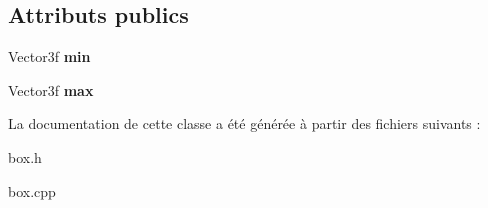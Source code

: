 \subsection*{Attributs publics}
\begin{DoxyCompactItemize}
\item 
\hypertarget{class_box_a4b5893565a3e2b26361338b19af0671a}{}Vector3f {\bfseries min}\label{class_box_a4b5893565a3e2b26361338b19af0671a}

\item 
\hypertarget{class_box_ac7d2365a0645043a21a055942019cd74}{}Vector3f {\bfseries max}\label{class_box_ac7d2365a0645043a21a055942019cd74}

\end{DoxyCompactItemize}


La documentation de cette classe a été générée à partir des fichiers suivants \+:\begin{DoxyCompactItemize}
\item 
box.\+h\item 
box.\+cpp\end{DoxyCompactItemize}

